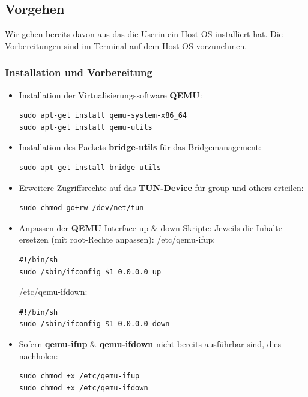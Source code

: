 \documentclass[a4,12pt]{scrartcl}
\begin{document}
\subsection{Vorgehen}
Wir gehen bereits davon aus das die Userin ein Host-OS installiert hat.
Die Vorbereitungen sind im Terminal auf dem Host-OS vorzunehmen. 

\subsubsection{Installation und Vorbereitung}
\begin{itemize}
\item Installation der Virtualisierungssoftware \textbf{QEMU}:
\begin{lstlisting} 
sudo apt-get install qemu-system-x86_64
sudo apt-get install qemu-utils
\end{lstlisting}
\item Installation des Packets \textbf{bridge-utils} für das Bridgemanagement:
\begin{lstlisting}
sudo apt-get install bridge-utils
\end{lstlisting}
\end{itemize} 

\begin{itemize}
\item Erweitere Zugriffsrechte auf das \textbf{TUN-Device} für group und others erteilen:
\begin{lstlisting}
sudo chmod go+rw /dev/net/tun
\end{lstlisting}
\end{itemize}

\begin{itemize}
\item Anpassen der \textbf{QEMU} Interface up \& down Skripte:
\newline
Jeweils die Inhalte ersetzen (mit root-Rechte anpassen):
\newline
/etc/qemu-ifup:
\begin{lstlisting}
#!/bin/sh                                                        
sudo /sbin/ifconfig $1 0.0.0.0 up
\end{lstlisting}
/etc/qemu-ifdown:
\begin{lstlisting}
#!/bin/sh                                                        
sudo /sbin/ifconfig $1 0.0.0.0 down
\end{lstlisting}
\end{itemize}

\begin{itemize}
\item Sofern \textbf{qemu-ifup} \& \textbf{qemu-ifdown} nicht bereits ausführbar sind, dies nachholen:
\begin{lstlisting}
sudo chmod +x /etc/qemu-ifup
sudo chmod +x /etc/qemu-ifdown
\end{lstlisting}
\end{itemize}
\end{document}
